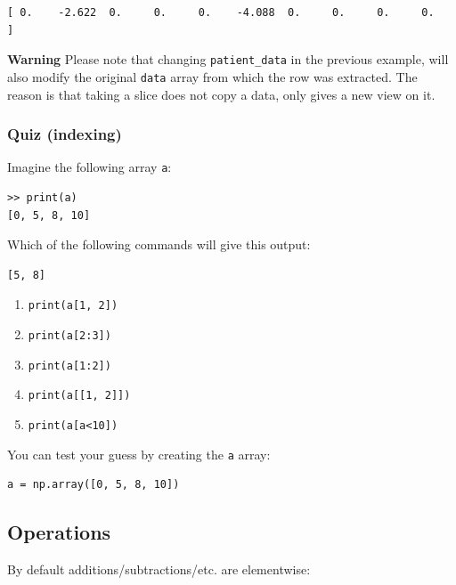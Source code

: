\documentclass[11pt]{article}
\begin{document}
    \begin{Verbatim}[commandchars=\\\{\}]
[ 0.    -2.622  0.     0.     0.    -4.088  0.     0.     0.     0.   ]
    \end{Verbatim}

    \textbf{Warning} Please note that changing \texttt{patient\_data} in the
previous example, will also modify the original \texttt{data} array from
which the row was extracted. The reason is that taking a slice does not
copy a data, only gives a new view on it.

    \hypertarget{quiz-indexing}{%
\subsubsection{Quiz (indexing)}\label{quiz-indexing}}

Imagine the following array \texttt{a}:

\begin{verbatim}
>> print(a)
[0, 5, 8, 10]
\end{verbatim}

Which of the following commands will give this output:

\begin{verbatim}
[5, 8]
\end{verbatim}

\begin{enumerate}
\def\labelenumi{\alph{enumi})}
\item
  \texttt{print(a{[}1,\ 2{]})}
\item
  \texttt{print(a{[}2:3{]})}
\item
  \texttt{print(a{[}1:2{]})}
\item
  \texttt{print(a{[}{[}1,\ 2{]}{]})}
\item
  \texttt{print(a{[}a\textless{}10{]})}
\end{enumerate}

You can test your guess by creating the \texttt{a} array:

\begin{verbatim}
a = np.array([0, 5, 8, 10])
\end{verbatim}

    \hypertarget{operations}{%
\subsection{Operations}\label{operations}}

    By default additions/subtractions/etc. are elementwise:
\end{document}
